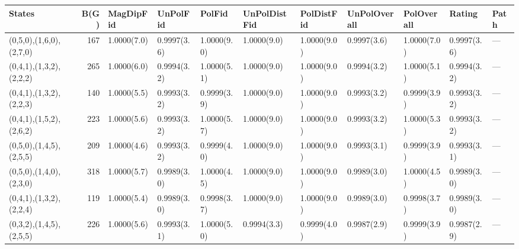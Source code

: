 \begin{tabular}{lrlllllllll}
\hline
 States                  &   B(G) & MagDipFid   & UnPolFid    & PolFid      & UnPolDistFid   & PolDistFid   & UnPolOverall   & PolOverall   & Rating      & Path   \\
\hline
 (0,5,0),(1,6,0),(2,7,0) &    167 & 1.0000(7.0) & 0.9997(3.6) & 1.0000(9.0) & 1.0000(9.0)    & 1.0000(9.0)  & 0.9997(3.6)    & 1.0000(7.0)  & 0.9997(3.6) & ---    \\
 (0,4,1),(1,3,2),(2,2,2) &    265 & 1.0000(6.0) & 0.9994(3.2) & 1.0000(5.1) & 1.0000(9.0)    & 1.0000(9.0)  & 0.9994(3.2)    & 1.0000(5.1)  & 0.9994(3.2) & ---    \\
 (0,4,1),(1,3,2),(2,2,3) &    140 & 1.0000(5.5) & 0.9993(3.2) & 0.9999(3.9) & 1.0000(9.0)    & 1.0000(9.0)  & 0.9993(3.2)    & 0.9999(3.9)  & 0.9993(3.2) & ---    \\
 (0,4,1),(1,5,2),(2,6,2) &    223 & 1.0000(5.6) & 0.9993(3.2) & 1.0000(5.7) & 1.0000(9.0)    & 1.0000(9.0)  & 0.9993(3.2)    & 1.0000(5.3)  & 0.9993(3.2) & ---    \\
 (0,5,0),(1,4,5),(2,5,5) &    209 & 1.0000(4.6) & 0.9993(3.2) & 0.9999(4.0) & 1.0000(9.0)    & 1.0000(9.0)  & 0.9993(3.1)    & 0.9999(3.9)  & 0.9993(3.1) & ---    \\
 (0,5,0),(1,4,0),(2,3,0) &    318 & 1.0000(5.7) & 0.9989(3.0) & 1.0000(4.5) & 1.0000(9.0)    & 1.0000(9.0)  & 0.9989(3.0)    & 1.0000(4.5)  & 0.9989(3.0) & ---    \\
 (0,4,1),(1,3,2),(2,2,4) &    119 & 1.0000(5.4) & 0.9989(3.0) & 0.9998(3.7) & 1.0000(9.0)    & 1.0000(9.0)  & 0.9989(3.0)    & 0.9998(3.7)  & 0.9989(3.0) & ---    \\
 (0,3,2),(1,4,5),(2,5,5) &    226 & 1.0000(5.6) & 0.9993(3.1) & 1.0000(5.0) & 0.9994(3.3)    & 0.9999(4.0)  & 0.9987(2.9)    & 0.9999(3.9)  & 0.9987(2.9) & ---    \\
\hline
\end{tabular}